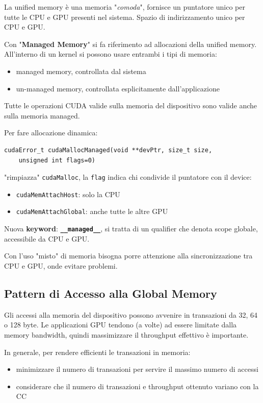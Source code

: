 
La unified memory è una memoria "\textit{comoda}", fornisce un puntatore unico per tutte le CPU e GPU presenti nel sistema. Spazio di indirizzamento unico per CPU e GPU.

Con "\textbf{Managed Memory}" si fa riferimento ad allocazioni della unified memory. All'interno di un kernel si possono usare entrambi i tipi di memoria: 
\begin{itemize}
	\item managed memory, controllata dal sistema
    
	\item un-managed memory, controllata esplicitamente dall'applicazione
\end{itemize}

Tutte le operazioni CUDA valide sulla memoria del dispositivo sono valide anche sulla memoria managed.

Per fare allocazione dinamica:
\begin{verbatim}
cudaError_t cudaMallocManaged(void **devPtr, size_t size, 
    unsigned int flags=0)
\end{verbatim}

"rimpiazza" \texttt{cudaMalloc}, la \texttt{flag} indica chi condivide il puntatore con il device:
\begin{itemize}
	\item \texttt{cudaMemAttachHost}: solo la CPU
    
	\item \texttt{cudaMemAttachGlobal}: anche tutte le altre GPU
\end{itemize}

Nuova \textbf{keyword}: \textbf{\texttt{\_\_managed\_\_}}, si tratta di un qualifier che denota scope globale, accessibile da CPU e GPU.

Con l'uso "misto" di memoria bisogna porre attenzione alla sincronizzazione tra CPU e GPU, onde evitare problemi.

\subsection{Pattern di Accesso alla Global Memory}

Gli accessi alla memoria del dispositivo possono avvenire in transazioni da 32, 64 o 128 byte. Le applicazioni GPU tendono (a volte) ad essere limitate dalla memory bandwidth, quindi massimizzare il throughput effettivo è importante. 

In generale, per rendere efficienti le transazioni in memoria:
\begin{itemize}
	\item minimizzare il numero di transazioni per servire il massimo numero di accessi
    
	\item considerare che il numero di transazioni e throughput ottenuto variano con la CC
\end{itemize}

